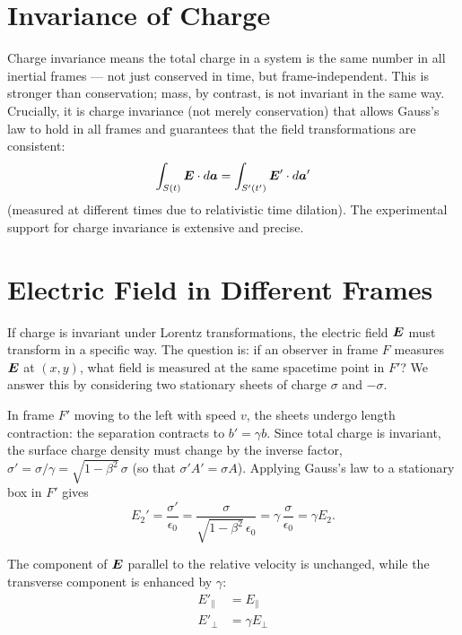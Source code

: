 \section*{Invariance of Charge}

Charge invariance means the total charge in a system is the same number in all inertial frames — not just conserved in time, but frame-independent. This is stronger than conservation; mass, by contrast, is not invariant in the same way. Crucially, it is charge invariance (not merely conservation) that allows Gauss's law to hold in all frames and guarantees that the field transformations are consistent:
\[
  \int_{S(t)} \vect{E}\cdot d\lvect{a} = \int_{S'(t')} \vect{E}'\cdot d\lvect{a}'
\]
(measured at different times due to relativistic time dilation). The experimental support for charge invariance is extensive and precise.

\section{Electric Field in Different Frames}

If charge is invariant under Lorentz transformations, the electric field $\vect{E}$ must transform in a specific way. The question is: if an observer in frame $F$ measures $\vect{E}$ at $(x,y)$, what field is measured at the same spacetime point in $F'$? We answer this by considering two stationary sheets of charge $\sigma$ and $-\sigma$.

In frame $F'$ moving to the left with speed $v$, the sheets undergo length contraction: the separation contracts to $b' = \gamma b$. Since total charge is invariant, the surface charge density must change by the inverse factor, $\sigma' = \sigma/\gamma = \sqrt{1-\beta^2}\,\sigma$ (so that $\sigma' A' = \sigma A$). Applying Gauss's law to a stationary box in $F'$ gives
\[
  E_2' = \frac{\sigma'}{\epsilon_0} = \frac{\sigma}{\sqrt{1-\beta^2}\,\epsilon_0} = \gamma\,\frac{\sigma}{\epsilon_0} = \gamma E_2.
\]

\begin{theorem}
The component of $\vect{E}$ parallel to the relative velocity is unchanged, while the transverse component is enhanced by $\gamma$:
\begin{align*}
  E'_{\parallel} &= E_{\parallel} \\
  E'_{\perp} &= \gamma E_{\perp}
\end{align*}
\end{theorem}

